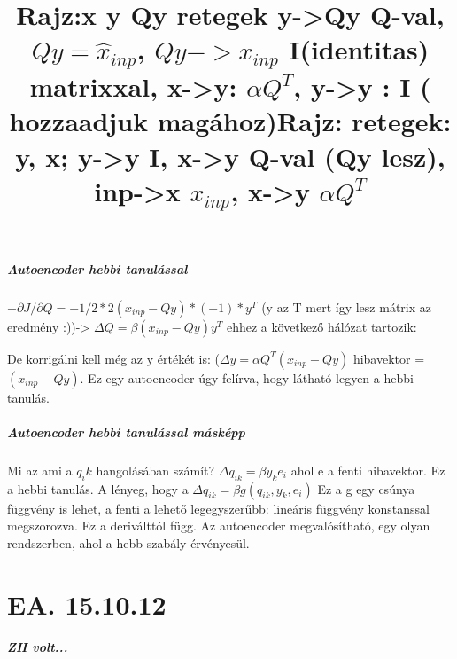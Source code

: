 \documentclass[10pt,a4paper]{report}
\begin{document}
\paragraph{Autoencoder hebbi tanulással}
$ -\partial J/\partial Q = -1/2*2(x_{inp} - Qy) * (-1) * y^T$ (y az T mert így lesz mátrix az eredmény :))->
$\Delta Q = \beta (x_{inp} - Qy)y^T$ ehhez a következő hálózat tartozik: 
\begin{figure}[h]
\title{Rajz:x y Qy retegek y->Qy Q-val, $Qy = \hat{x}_{inp}$, $Qy->x_{inp}$ I(identitas) matrixxal, x->y: $\alpha Q^T$, y->y : I ( hozzaadjuk magához)}
\end{figure}
De korrigálni kell még az y értékét is: ($\Delta y = \alpha Q^T(x_{inp}-Qy)$ hibavektor = $(x_{inp}-Qy)$. Ez egy autoencoder úgy felírva, hogy látható legyen a hebbi tanulás.
\paragraph{Autoencoder hebbi tanulással másképp}
\begin{figure}[h]
\title{Rajz: retegek: y, x; y->y I, x->y Q-val (Qy lesz), inp->x $x_{inp}$, x->y $\alpha Q^T$}
\end{figure}
Mi az ami a $q_ik$ hangolásában számít? 
$\Delta q_{ik} = \beta y_ke_i$ ahol e a fenti hibavektor. Ez a hebbi tanulás. A lényeg, hogy a $\Delta q_{ik} = \beta g(q_{ik}, y_k, e_i)$ Ez a g egy csúnya függvény is lehet, a fenti a lehető legegyszerűbb: lineáris függvény konstanssal megszorozva. Ez a deriválttól függ. Az autoencoder megvalósítható, egy olyan rendszerben, ahol a hebb szabály érvényesül.

\chapter{EA. 15.10.12}
\paragraph{ZH volt...}
\end{document}

